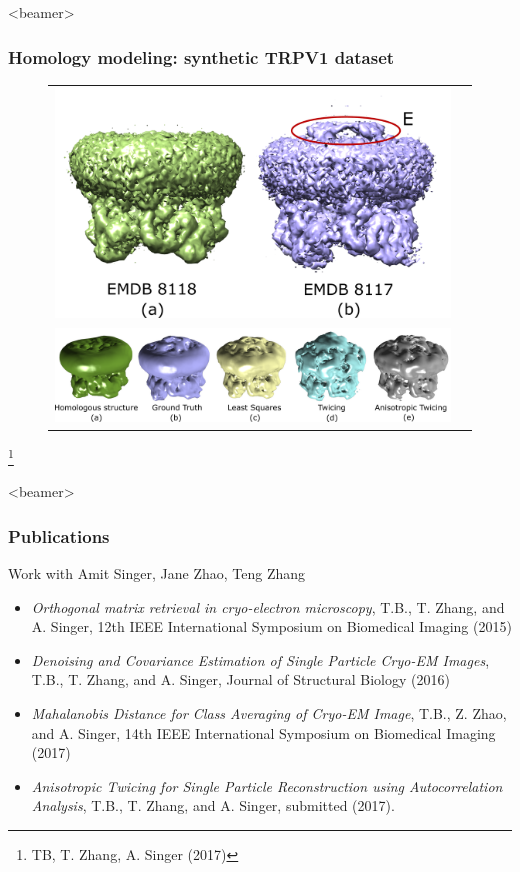 \documentclass{beamer}
\newcommand\blfootnote[1]{%
  \begingroup
  \renewcommand\thefootnote{}\footnote{#1}%
  \addtocounter{footnote}{-1}%
  \endgroup
}
\begin{document}
\begin{frame}<beamer>
\frametitle{Homology modeling: synthetic TRPV1 dataset}
\begin{figure}[!htbp]
\begin{tabular}{cc}
\includegraphics[width=0.45\linewidth]{figures/sim8117_compare.pdf}\label{fig:simtrpv_emdb} \\
\includegraphics[width=0.95\linewidth]{figures/sim8117.pdf}\label{fig:simtrpv_res}\\
\end{tabular}
\end{figure}\blfootnote{TB, T. Zhang, A. Singer (2017)}
\end{frame}

\begin{frame}<beamer>
\frametitle{Publications}
Work with Amit Singer, Jane Zhao, Teng Zhang\\
\begin{itemize}
\item \tiny{\textit{Orthogonal matrix retrieval in cryo-electron microscopy}, T.B., T. Zhang, and A. Singer, 12th IEEE International Symposium on Biomedical Imaging (2015)}

\item \tiny{\textit{Denoising and Covariance Estimation of Single Particle Cryo-EM Images}, T.B., T. Zhang, and A. Singer, Journal of Structural Biology (2016)}

\item \textit{Mahalanobis Distance for Class Averaging of Cryo-EM Image}, T.B., Z. Zhao, and A. Singer, 14th IEEE International Symposium on Biomedical Imaging (2017)

\item \textit{Anisotropic Twicing for Single Particle Reconstruction using Autocorrelation Analysis}, T.B., T. Zhang, and A. Singer, submitted (2017).

\end{itemize}
\end{frame}
\end{document}
